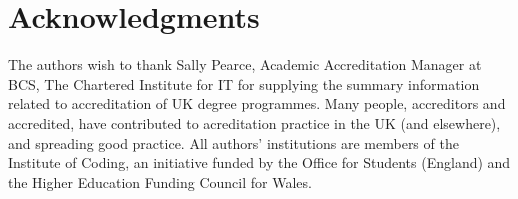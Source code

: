 \documentclass[sigconf]{acmart}
\begin{document}
\section{Acknowledgments}
The authors wish to thank Sally Pearce, Academic Accreditation Manager at BCS, The Chartered Institute for IT for supplying the summary information related to accreditation of UK degree programmes. Many people, accreditors and accredited, have contributed to acreditation practice in the UK (and elsewhere), and spreading good practice.  All authors' institutions are members of the Institute of Coding, an initiative funded by the Office for Students (England) and the Higher Education Funding Council for Wales.

%

\end{document}
